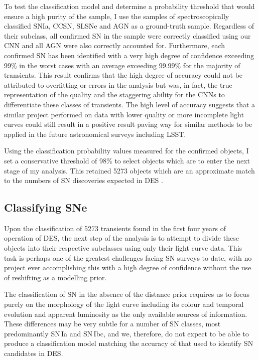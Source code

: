 To test the classification model and determine a probability threshold that would ensure a high purity of the sample, I use the samples of spectroscopically classified SNIa, CCSN, SLSNe and AGN as a ground-truth sample. Regardless of their subclass, all confirmed SN in the sample were correctly classified using our CNN and all AGN were also correctly accounted for. Furthermore, each confirmed SN has been identified with a very high degree of confidence exceeding 99\% in the worst cases with an average exceeding 99.99\% for the majority of transients. This result confirms that the high degree of accuracy could not be attributed to overfitting or errors in the analysis but was, in fact, the true representation of the quality and the staggering ability for the CNNs to differentiate these classes of transients. The high level of accuracy suggests that a similar project performed on data with lower quality or more incomplete light curves could still result in a positive result paving way for similar methods to be applied in the future astronomical surveys including LSST.

Using the classification probability values measured for the confirmed objects, I set a conservative threshold of 98\% to select objects which are to enter the next stage of my analysis. This retained 5273 objects which are an approximate match to the numbers of SN discoveries expected in DES \citep{Bernstein2012}.

\subsection{Classifying SNe}
Upon the classification of 5273 transients found in the first four years of operation of DES, the next step of the analysis is to attempt to divide these objects into their respective subclasses using only their light curve data. This task is perhaps one of the greatest challenges facing SN surveys to date, with no project ever accomplishing this with a high degree of confidence without the use of reshifting as a modelling prior.

The classification of SN in the absence of the distance prior requires us to focus purely on the morphology of the light curve including its colour and temporal evolution and apparent luminosity as the only available sources of information. These differences may be very subtle for a number of SN classes, most predominantly SN\,Ia and SN\,Ibc, and we, therefore, do not expect to be able to produce a classification model matching the accuracy of that used to identify SN candidates in DES.

